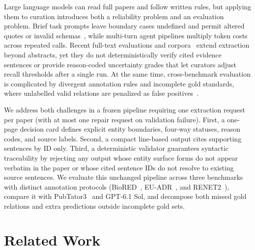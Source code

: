 \documentclass[preprint,10pt,letterpaper]{elsarticle}
\begin{document}
Large language models can read full papers and follow written rules, but applying them to curation introduces both a reliability problem and an evaluation problem. Brief task prompts leave boundary cases undefined and permit altered quotes or invalid schemas~\cite{chen2025benchmarking,wadhwa2023revisiting}, while multi-turn agent pipelines multiply token costs across repeated calls. Recent full-text evaluations and corpora~\cite{yin2026benchmarking,collins2026biotriplex} extend extraction beyond abstracts, yet they do not deterministically verify cited evidence sentences or provide reason-coded uncertainty grades that let curators adjust recall thresholds after a single run. At the same time, cross-benchmark evaluation is complicated by divergent annotation rules and incomplete gold standards, where unlabelled valid relations are penalized as false positives~\cite{wadhwa2023revisiting,fan2024evaluating}.

We address both challenges in a frozen pipeline requiring one extraction request per paper (with at most one repair request on validation failure). First, a one-page decision card defines explicit entity boundaries, four-way statuses, reason codes, and source labels. Second, a compact line-based output cites supporting sentences by ID only. Third, a deterministic validator guarantees syntactic traceability by rejecting any output whose entity surface forms do not appear verbatim in the paper or whose cited sentence IDs do not resolve to existing source sentences. We evaluate this unchanged pipeline across three benchmarks with distinct annotation protocols (BioRED~\cite{luo2022biored}, EU-ADR~\cite{vanmulligen2012euadr}, and RENET2~\cite{su2021renet2}), compare it with PubTator3~\cite{wei2024pubtator3} and GPT-6.1 Sol, and decompose both missed gold relations and extra predictions outside incomplete gold sets.

\section{Related Work}
\end{document}
